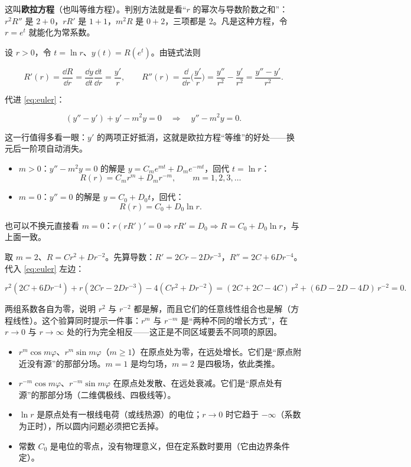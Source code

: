 这叫\textbf{欧拉方程}（也叫等维方程）。判别方法就是看“$r$ 的幂次与导数阶数之和”：$r^2R''$ 是 $2+0$，$rR'$ 是 $1+1$，$m^2R$ 是 $0+2$，三项都是 2。凡是这种方程，令 $r=e^t$ 就能化为常系数。


设 $r>0$，令 $t=\ln r$、$y(t)=R(e^t)$。由链式法则

\[
R'(r)=\frac{\dd R}{\dd r}=\frac{\dd y}{\dd t}\frac{\dd t}{\dd r}=\frac{y'}{r},
\qquad
R''(r)=\frac{\dd}{\dd r}\Big(\frac{y'}{r}\Big)=\frac{y''}{r^2}-\frac{y'}{r^2}=\frac{y''-y'}{r^2}.
\]

代进 \eqref{eq:euler}：

\[
(y''-y')+y'-m^2y=0\quad\Longrightarrow\quad y''-m^2y=0 .
\]

这一行值得多看一眼：$y'$ 的两项正好抵消，这就是欧拉方程“等维”的好处——换元后一阶项自动消失。


\begin{itemize}
  \item $m>0$：$y''-m^2y=0$ 的解是 $y=C_me^{mt}+D_me^{-mt}$，回代 $t=\ln r$：
  \[
  R(r)=C_mr^m+D_mr^{-m},\qquad m=1,2,3,\dots
  \]
  \item $m=0$：$y''=0$ 的解是 $y=C_0+D_0t$，回代：
  \[
  R(r)=C_0+D_0\ln r .
  \]
\end{itemize}

也可以不换元直接看 $m=0$：$r(rR')'=0\Rightarrow rR'=D_0\Rightarrow R=C_0+D_0\ln r$，与上面一致。


取 $m=2$、$R=Cr^2+Dr^{-2}$。先算导数：$R'=2Cr-2Dr^{-3}$，$R''=2C+6Dr^{-4}$。代入 \eqref{eq:euler} 左边：

\[
r^2(2C+6Dr^{-4})+r(2Cr-2Dr^{-3})-4(Cr^2+Dr^{-2})
=(2C+2C-4C)\,r^2+(6D-2D-4D)\,r^{-2}=0 .
\]

两组系数各自为零，说明 $r^2$ 与 $r^{-2}$ 都是解，而且它们的任意线性组合也是解（方程线性）。这个验算同时提示一件事：$r^m$ 与 $r^{-m}$ 是“两种不同的增长方式”，在 $r\to0$ 与 $r\to\infty$ 处的行为完全相反——这正是不同区域要丢不同项的原因。


\begin{itemize}
  \item $r^m\cos m\varphi$、$r^m\sin m\varphi$（$m\ge1$）在原点处为零，在远处增长。它们是“原点附近没有源”的那部分场。$m=1$ 是均匀场，$m=2$ 是四极场，依此类推。
  \item $r^{-m}\cos m\varphi$、$r^{-m}\sin m\varphi$ 在原点处发散、在远处衰减。它们是“原点处有源”的那部分场（二维偶极线、四极线等）。
  \item $\ln r$ 是原点处有一根线电荷（或线热源）的电位；$r\to0$ 时它趋于 $-\infty$（系数为正时），所以圆内问题必须把它丢掉。
  \item 常数 $C_0$ 是电位的零点，没有物理意义，但在定系数时要用（它由边界条件定）。
\end{itemize}

